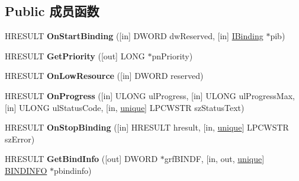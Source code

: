 \subsection*{Public 成员函数}
\begin{DoxyCompactItemize}
\item 
\mbox{\label{interface_i_bind_status_callback_a5e10758570b0075f5dbed48821d9b801}} 
H\+R\+E\+S\+U\+LT {\bfseries On\+Start\+Binding} (\mbox{[}in\mbox{]} D\+W\+O\+RD dw\+Reserved, \mbox{[}in\mbox{]} \hyperlink{interface_i_binding}{I\+Binding} $\ast$pib)
\item 
\mbox{\label{interface_i_bind_status_callback_a798139cae260407f6642ffaad14a6cfb}} 
H\+R\+E\+S\+U\+LT {\bfseries Get\+Priority} (\mbox{[}out\mbox{]} L\+O\+NG $\ast$pn\+Priority)
\item 
\mbox{\label{interface_i_bind_status_callback_a4707503ce9c2a99de34b73627fc778a3}} 
H\+R\+E\+S\+U\+LT {\bfseries On\+Low\+Resource} (\mbox{[}in\mbox{]} D\+W\+O\+RD reserved)
\item 
\mbox{\label{interface_i_bind_status_callback_ada5395666cca39352a6e984402ed0a9b}} 
H\+R\+E\+S\+U\+LT {\bfseries On\+Progress} (\mbox{[}in\mbox{]} U\+L\+O\+NG ul\+Progress, \mbox{[}in\mbox{]} U\+L\+O\+NG ul\+Progress\+Max, \mbox{[}in\mbox{]} U\+L\+O\+NG ul\+Status\+Code, \mbox{[}in, \hyperlink{interfaceunique}{unique}\mbox{]} L\+P\+C\+W\+S\+TR sz\+Status\+Text)
\item 
\mbox{\label{interface_i_bind_status_callback_a310074131516e536a73cd9052fae634a}} 
H\+R\+E\+S\+U\+LT {\bfseries On\+Stop\+Binding} (\mbox{[}in\mbox{]} H\+R\+E\+S\+U\+LT hresult, \mbox{[}in, \hyperlink{interfaceunique}{unique}\mbox{]} L\+P\+C\+W\+S\+TR sz\+Error)
\item 
\mbox{\label{interface_i_bind_status_callback_a9c7e8d26403f5aa00ea2134215726116}} 
H\+R\+E\+S\+U\+LT {\bfseries Get\+Bind\+Info} (\mbox{[}out\mbox{]} D\+W\+O\+RD $\ast$grf\+B\+I\+N\+DF, \mbox{[}in, out, \hyperlink{interfaceunique}{unique}\mbox{]} \hyperlink{struct_i_bind_status_callback_1_1__tag_b_i_n_d_i_n_f_o}{B\+I\+N\+D\+I\+N\+FO} $\ast$pbindinfo)

\end{DoxyCompactItemize}
